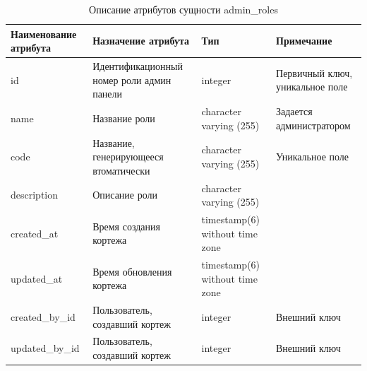 \documentclass{mirea}
\begin{document}
	\begin{longtable}{ |p{}|p{}|p{}|p{}| } 
		\caption{Описание атрибутов сущности admin\_roles}
		\endfirsthead
		\endhead
		\hline
		Наименование атрибута & Назначение атрибута & Тип & Примечание \\ \hline
		
		id & Идентификацион\-ный номер роли админ панели & integer & Первичный ключ, уникальное поле \\ \hline
		
		name & Название роли & character varying (255) & Задается администратором \\ \hline
		
		code & Название, генерирующееся втоматически  & character varying (255) & Уникальное поле \\ \hline
		
		description & Описание роли  & character varying (255) & \\ \hline
		
		created\_at & Время создания кортежа & timestamp(6) without time zone & \\ \hline
		
		updated\_at & Время обновления кортежа & timestamp(6) without time zone & \\ \hline
		
		created\_by\_id & Пользователь, создавший кортеж & integer & Внешний ключ \\ \hline
		
		updated\_by\_id & Пользователь, создавший кортеж & integer & Внешний ключ \\ \hline
		
	\end{longtable}
\end{document}
